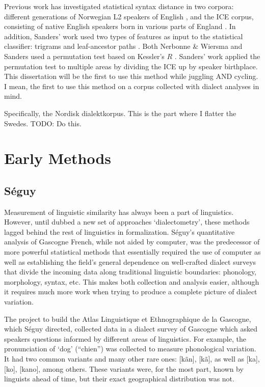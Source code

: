\documentclass[11pt]{article}
\begin{document}
Previous work has investigated statistical syntax distance in two
corpora: different generations of Norwegian L2 speakers of English
\cite{nerbonne06}, and the ICE corpus, consisting of native English
speakers born in various parts of England \cite{nelson02}. In
addition, Sanders' work used two types of features as input to the
statistical classifier: trigrams and leaf-ancestor paths
\cite{sampson00}. Both Nerbonne \& Wiersma and Sanders used a
permutation test based on Kessler's $R$ \cite{kessler01}. Sanders'
work applied the permutation test to multiple areas by dividing the
ICE up by speaker birthplace. This dissertation will be the first to
use this method while juggling AND cycling. I mean, the first to use
this method on a corpus collected with dialect analyses in mind.

Specifically, the Nordisk dialektkorpus. This is the part where I
flatter the Swedes. TODO: Do this.

\section{Early Methods}

\subsection{S\'eguy}

Measurement of linguistic similarity has always been a part of
linguistics. However, until  dubbed a new set of
approaches `dialectometry', these methods lagged behind the rest of
linguistics in formalization. S\'eguy's quantitative analysis
of Gascogne French, while not aided by computer, was the predecessor
of more powerful statistical methods that essentially required the use
of computer as well as establishing the field's general dependence on
well-crafted dialect surveys that divide the incoming data along
traditional linguistic boundaries: phonology, morphology, syntax, etc.
This makes both collection and analysis easier, although it requires
much more work when trying to produce a complete picture of dialect
variation.

The project to build the Atlas Linguistique et Ethnographique de la
Gascogne, which S\'eguy directed, collected data in a dialect survey
of Gascogne which asked speakers questions informed by different areas
of linguistics. For example, the pronunciation of `dog' (``chien'')
was collected to measure phonological variation. It had two common
variants and many other rare ones: [k\~an], [k\~a], as well as [ka],
[ko], [kano], among others. These variants were, for the most part,
known by linguists ahead of time, but their exact geographical
distribution was not.
\end{document}
